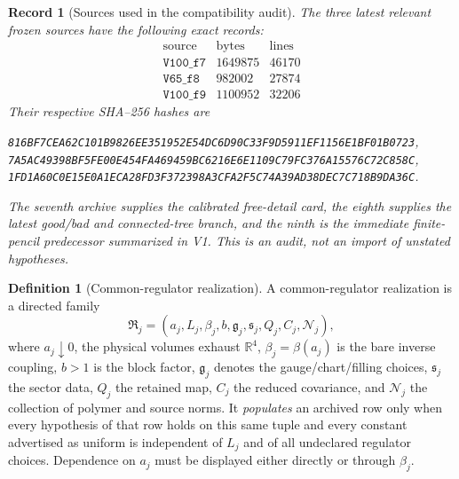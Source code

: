 \documentclass[11pt,oneside]{article}
\newtheorem{record}[theorem]{Record}
\theoremstyle{definition}
\newtheorem{definition}[theorem]{Definition}
\theoremstyle{remark}
\begin{document}
\begin{record}[Sources used in the compatibility audit]
\label{rec:newv99-sources}
The three latest relevant frozen sources have the following exact
records:
\[
\begin{array}{c|r|r}
\text{source}&\text{bytes}&\text{lines}\\ \hline
\texttt{V100\_f7}&1649875&46170\\
\texttt{V65\_f8}& 982002&27874\\
\texttt{V100\_f9}&1100952&32206
\end{array}                                                   \tag{99.1}
\]
Their respective SHA--256 hashes are
\begin{center}\scriptsize
\texttt{816BF7CEA62C101B9826EE351952E54DC6D90C33F9D5911EF1156E1BF01B0723},\\
\texttt{7A5AC49398BF5FE00E454FA469459BC6216E6E1109C79FC376A15576C72C858C},\\
\texttt{1FD1A60C0E15E0A1ECA28FD3F372398A3CFA2F5C74A39AD38DEC7C718B9DA36C}.
\end{center}
The seventh archive supplies the calibrated free-detail card, the
eighth supplies the latest good/bad and connected-tree branch, and
the ninth is the immediate finite-pencil predecessor summarized in
V1.  This is an audit, not an import of unstated hypotheses.
\end{record}

\begin{definition}[Common-regulator realization]
\label{def:newv99-common-regulator}
A common-regulator realization is a directed family
\[
 {\mathfrak R}_j=
 (a_j,L_j,\beta_j,b,\mathfrak g_j,\mathfrak s_j,
  Q_j,C_j,\mathcal N_j),                             \tag{99.2}
\]
where \(a_j\downarrow0\), the physical volumes exhaust
\(\mathbb R^4\), \(\beta_j=\beta(a_j)\) is the bare inverse
coupling, \(b>1\) is the block factor, \(\mathfrak g_j\) denotes the
gauge/chart/filling choices, \(\mathfrak s_j\) the sector data,
\(Q_j\) the retained map, \(C_j\) the reduced covariance, and
\(\mathcal N_j\) the collection of polymer and source norms.
It \emph{populates} an archived row only when every hypothesis of
that row holds on this same tuple and every constant advertised as
uniform is independent of \(L_j\) and of all undeclared regulator
choices.  Dependence on \(a_j\) must be displayed either directly
or through \(\beta_j\).
\end{definition}
\end{document}
